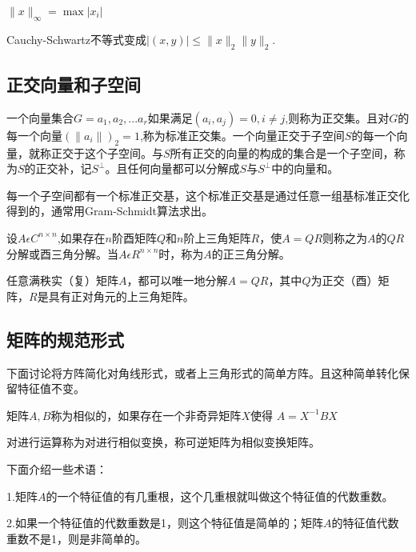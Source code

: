 \documentclass{article}
\begin{document}
$\parallel x \parallel_\infty=\max |x_i|$

Cauchy-Schwartz不等式变成$|(x,y)|\leqslant \parallel x \parallel_2\parallel y\parallel_2$.





















\subsection{正交向量和子空间}
一个向量集合$G={a_1,a_2,...a_r}$如果满足$(a_i,a_j)=0,i\neq j$,则称为正交集。且对$G$的每一个向量$(\parallel a_i \parallel)_2=1$,称为标准正交集。一个向量正交于子空间$S$的每一个向量，就称正交于这个子空间。与$S$所有正交的向量的构成的集合是一个子空间，称为$S$的正交补，记$S^\perp$。且任何向量都可以分解成$S$与$S^\perp$中的向量和。

每一个子空间都有一个标准正交基，这个标准正交基是通过任意一组基标准正交化得到的，通常用Gram-Schmidt算法求出。

\begin{definition}
设$A\epsilon C^{n\times n}$,如果存在$n$阶酉矩阵$Q$和$n$阶上三角矩阵$R$，使$A=QR$则称之为$A$的$QR$分解或酉三角分解。当$A\epsilon R^{n\times n}$时，称为$A$的正三角分解。
\end{definition}

任意满秩实（复）矩阵$A$，都可以唯一地分解$A=QR$，其中$Q$为正交（酉）矩阵，$R$是具有正对角元的上三角矩阵。
\subsection{矩阵的规范形式}
下面讨论将方阵简化对角线形式，或者上三角形式的简单方阵。且这种简单转化保留特征值不变。

\begin{definition}
矩阵$A,B$称为相似的，如果存在一个非奇异矩阵$X$使得   $A=X^{-1}BX$  
\end{definition}

对进行运算称为对进行相似变换，称可逆矩阵为相似变换矩阵。

下面介绍一些术语：

1.矩阵$A$的一个特征值的有几重根，这个几重根就叫做这个特征值的代数重数。

2.如果一个特征值的代数重数是1，则这个特征值是简单的；矩阵$A$的特征值代数重数不是1，则是非简单的。
\end{document}
